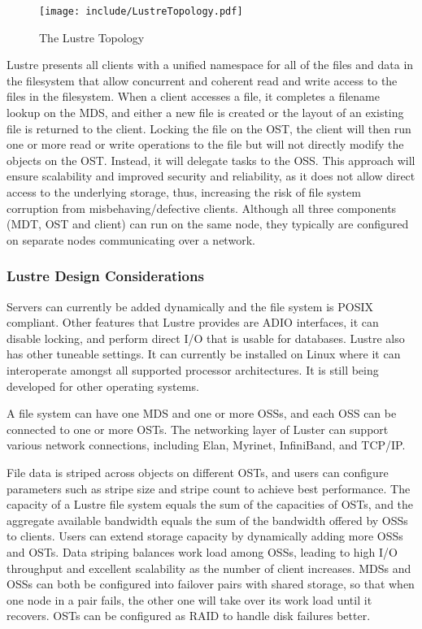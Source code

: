 \documentclass[11pt]{article}
\begin{document}
\begin{figure}[htbp]
  \centering
  \texttt{[image: include/LustreTopology.pdf]}
  \caption{The Lustre Topology}
  \label{fig:LustreTopology}
\end{figure}

Lustre presents all clients with a unified namespace for all of the 
files and data in the filesystem that allow concurrent and coherent 
read and write access to the files in the filesystem. When a client 
accesses a file, it completes a filename lookup on the MDS, and 
either a new file is created or the layout of an existing file is 
returned to the client. Locking the file on the OST, the client will 
then run one or more read or write operations to the file but will 
not directly modify the objects on the OST. Instead, it will delegate 
tasks to the OSS. This approach will ensure scalability and improved 
security and reliability, as it does not allow direct access to the 
underlying storage, thus, increasing the risk of file system corruption 
from misbehaving/defective clients. Although all three components 
(MDT, OST and client) can run on the same node, they typically are 
configured on separate nodes communicating over a network.

\subsubsection{Lustre Design Considerations}
Servers can currently be added dynamically and the file system is 
POSIX compliant. Other features that Lustre provides are ADIO 
interfaces, it can disable locking, and perform direct I/O that is 
usable for databases. Lustre also has other tuneable settings. It can 
currently be installed on Linux where it can interoperate amongst all 
supported processor architectures. It is still being developed for 
other operating systems.

A file system can have one MDS and one or more OSSs, and each OSS can 
be connected to one or more OSTs. The networking layer of Luster can 
support various network connections, including Elan, Myrinet, InfiniBand, 
and TCP/IP.

File data is striped across objects on different OSTs, and users can 
configure parameters such as stripe size and stripe count to achieve 
best performance. The capacity of a Lustre file system equals the sum 
of the capacities of OSTs, and the aggregate available bandwidth equals 
the sum of the bandwidth offered by OSSs to clients. Users can extend 
storage capacity by dynamically adding more OSSs and OSTs. Data striping 
balances work load among OSSs, leading to high I/O throughput and 
excellent scalability as the number of client increases. MDSs and OSSs 
can both be configured into failover pairs with shared storage, so that 
when one node in a pair fails, the other one will take over its work load 
until it recovers. OSTs can be configured as RAID to handle disk failures 
better.
\end{document}
